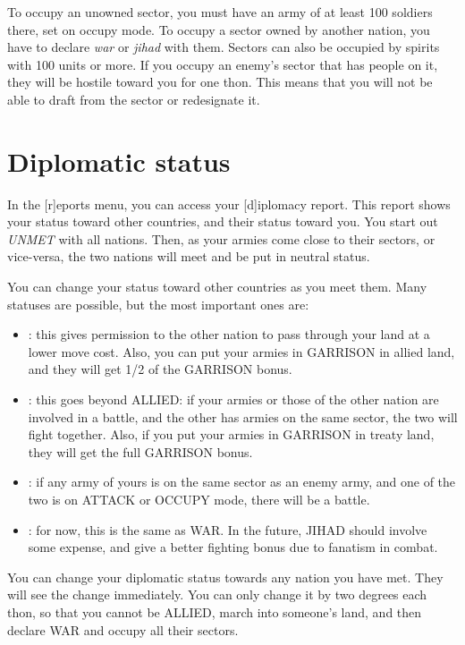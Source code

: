 To occupy an unowned sector, you must have an army of at least 100
soldiers there, set on occupy mode.  To occupy a sector owned by
another nation, you have to declare {\em war} or {\em jihad} with
them.  Sectors can also be occupied by spirits with 100 units or more.
If you occupy an enemy's sector that has people on it, they will be
hostile toward you for one thon.  This means that you will not be able
to draft from the sector or redesignate it.

\section{Diplomatic status}
\label{sec-diplomacy}
In the [r]eports menu, you can access your [d]iplomacy report.  This
report shows your status toward other countries, and their status
toward you.  You start out {\em UNMET} with all nations.  Then, as
your armies come close to their sectors, or vice-versa, the two
nations will meet and be put in neutral status.

You can change your status toward other countries as you meet them.
Many statuses are possible, but the most important ones are:
\begin{itemize}
\item
{}: 
this gives permission to the other nation to pass through your land at
a lower move cost.  Also, you can put your armies in GARRISON in
allied land, and they will get 1/2 of the GARRISON bonus.
\item
{}:
this goes beyond ALLIED: if your armies or those of the other nation
are involved in a battle, and the other has armies on the same sector,
the two will fight together.  Also, if you put your armies in GARRISON
in treaty land, they will get the full GARRISON bonus.
\item
{}:
if any army of yours is on the same sector as an enemy army, and one
of the two is on ATTACK or OCCUPY mode, there will be a battle.
\item
{}:
for now, this is the same as WAR.  In the future, JIHAD should involve
some expense, and give a better fighting bonus due to fanatism in
combat.
\end{itemize}

You can change your diplomatic status towards any nation you have met.
They will see the change immediately.  You can only change it by two
degrees each thon, so that you cannot be ALLIED, march into someone's
land, and then declare WAR and occupy all their sectors.

